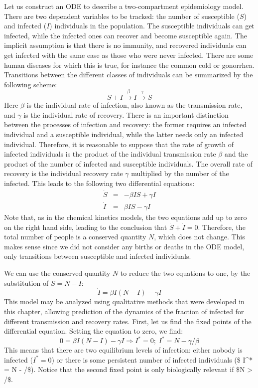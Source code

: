 \documentclass[
  letterpaper,
  DIV=11,
  numbers=noendperiod]{scrreprt}
\begin{document}
Let us construct an ODE to describe a two-compartment epidemiology
model. There are two dependent variables to be tracked: the number of
susceptible (\(S\)) and infected (\(I\)) individuals in the population.
The susceptible individuals can get infected, while the infected ones
can recover and become susceptible again. The implicit assumption is
that there is no immunity, and recovered individuals can get infected
with the same ease as those who were never infected. There are some
human diseases for which this is true, for instance the common cold or
gonorrhea. Transitions between the different classes of individuals can
be summarized by the following scheme:
\[ S + I \xrightarrow{\beta} I \xrightarrow{\gamma} S \] Here \(\beta\)
is the individual rate of infection, also known as the transmission
rate, and \(\gamma\) is the individual rate of recovery. There is an
important distinction between the processes of infection and recovery:
the former requires an infected individual and a susceptible individual,
while the latter needs only an infected individual. Therefore, it is
reasonable to suppose that the rate of growth of infected individuals is
the product of the individual transmission rate \(\beta\) and the
product of the number of infected and susceptible individuals. The
overall rate of recovery is the individual recovery rate \(\gamma\)
multiplied by the number of the infected. This leads to the following
two differential equations: \begin{eqnarray*}
\dot S &=& -\beta IS + \gamma I \\
\dot I & = &\beta I S - \gamma I
\end{eqnarray*} Note that, as in the chemical kinetics models, the two
equations add up to zero on the right hand side, leading to the
conclusion that \(\dot S + \dot I = 0\). Therefore, the total number of
people is a conserved quantity \(N\), which does not change. This makes
sense since we did not consider any births or deaths in the ODE model,
only transitions between susceptible and infected individuals.

We can use the conserved quantity \(N\) to reduce the two equations to
one, by the substitution of \(S = N -I\):
\[  \dot I  =  \beta I (N - I) - \gamma I \] This model may be analyzed
using qualitative methods that were developed in this chapter, allowing
prediction of the dynamics of the fraction of infected for different
transmission and recovery rates. First, let us find the fixed points of
the differential equation. Setting the equation to zero, we find:
\[ 0  =  \beta I (N - I) - \gamma I \Rightarrow I^* = 0; \; I^* =  N - \gamma/\beta \]
This means that there are two equilibrium levels of infection: either
nobody is infected (\(I^* = 0\)) or there is some persistent number of
infected individuals (\$ I\^{}* = N - \gamma/\beta \$). Notice that the
second fixed point is only biologically relevant if \$N \textgreater{}
\gamma/\beta \$.
\end{document}
